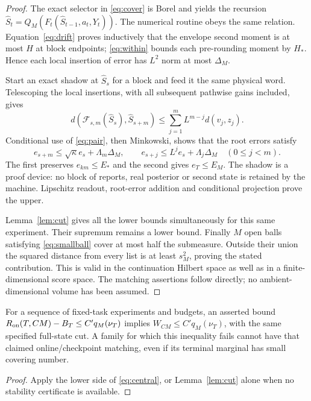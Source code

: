 \begin{proof}
The exact selector in \eqref{eq:cover} is Borel and yields the recursion $\widehat S_t=Q_M(F_t(\widehat S_{t-1},a_t,Y_t))$. The numerical routine obeys the same relation. Equation~\eqref{eq:drift} proves inductively that the envelope second moment is at most $H$ at block endpoints; \eqref{eq:within} bounds each pre-rounding moment by $H_*$. Hence each local insertion of error has $L^2$ norm at most $\Delta_M$.

Start an exact shadow at $\widehat S_s$ for a block and feed it the same physical word. Telescoping the local insertions, with all subsequent pathwise gains included, gives
\[
 d(\mathscr F_{s,m}(\widehat S_s),\widehat S_{s+m})
 \le\sum_{j=1}^m L^{m-j}d(v_j,z_j).
\]
Conditional use of \eqref{eq:pair}, then Minkowski, shows that the root errors satisfy
\[
 e_{s+m}\le\sqrt\kappa e_s+\Lambda_m\Delta_M,
 \qquad e_{s+j}\le L^je_s+\Lambda_j\Delta_M\quad(0\le j<m).
\]
The first preserves $e_{km}\le E_*$ and the second gives $e_T\le E_M$. The shadow is a proof device: no block of reports, real posterior or second state is retained by the machine. Lipschitz readout, root-error addition and conditional projection prove the upper.

Lemma~\ref{lem:cut} gives all the lower bounds simultaneously for this same experiment. Their supremum remains a lower bound. Finally $M$ open balls satisfying \eqref{eq:smallball} cover at most half the submeasure. Outside their union the squared distance from every list is at least $s_M^2$, proving the stated contribution. This is valid in the continuation Hilbert space as well as in a finite-dimensional score space. The matching assertions follow directly; no ambient-dimensional volume has been assumed.
\end{proof}

\begin{corollary}\label{cor:necessary}
For a sequence of fixed-task experiments and budgets, an asserted bound
$R_{\mathrm{on}}(T,CM)-B_T\le C' q_M(\nu_T)$ implies
$W_{CM}\le C' q_M(\nu_T)$, with the same specified full-state cut. A family for which this inequality fails cannot have that claimed online/checkpoint matching, even if its terminal marginal has small covering number.
\end{corollary}
\begin{proof}
Apply the lower side of \eqref{eq:central}, or Lemma~\ref{lem:cut} alone when no stability certificate is available.
\end{proof}

